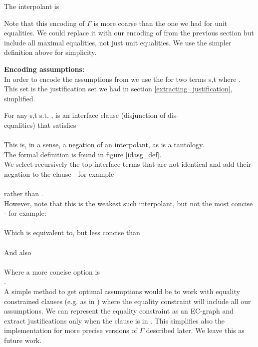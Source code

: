 \noindent
The interpolant is 

Note that this encoding of $\Gamma$ is more coarse than the one we had for unit equalities.
We could replace it with our encoding of  from the previous section but include all maximal equalities, not just unit equalities. We use the simpler definition above for simplicity.

\textbf{Encoding assumptions:}\\
In order to encode the assumptions from \eqg{} we use the  for two terms s,t where . This set is the justification set we had in section \ref{extracting_justification}, simplified.

For any s,t s.t. ,  is an interface clause (disjunction of dis-\\
equalities) that satisfies \\
\\
This is, in a sense, a negation of an interpolant, as  is a tautology.\\
The formal definition is found in figure \ref{idasg_def}.\\
We select recursively the top interface-terms that are not identical and add their negation to the clause - for example \\
 \\
rather than .\\
However, note that this is the weakest such interpolant, but not the most concise - for example:\\
 \\
Which is equivalent to, but less concise than \\
\\
And also \\
 \\
Where a more concise option is \\
.\\
A simple method to get optimal assumptions would be to work with equality constrained clauses (e.g. as in \cite{DBLP:conf/cade/NieuwenhuisR92}) where the equality constraint will include all our assumptions. 
We can represent the equality constraint as an EC-graph and extract justifications only when the clause is in \langI.
This simplifies also the implementation for more precise versions of $\Gamma$ described later. 
We leave this as future work.

